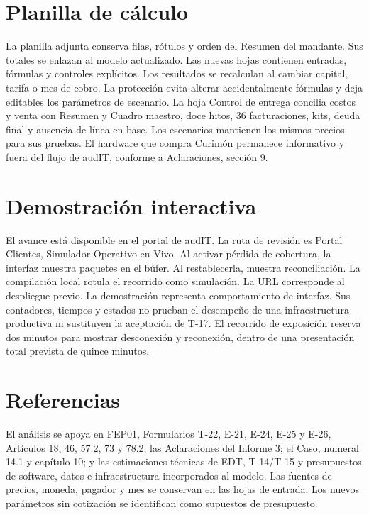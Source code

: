 \section{Planilla de cálculo}\label{sec:eco-planilla}
La planilla adjunta conserva filas, rótulos y orden del Resumen del mandante. Sus totales se enlazan al modelo actualizado. Las nuevas hojas contienen entradas, fórmulas y controles explícitos. Los resultados se recalculan al cambiar capital, tarifa o mes de cobro. La protección evita alterar accidentalmente fórmulas y deja editables los parámetros de escenario.
La hoja Control de entrega concilia costos y venta con Resumen y Cuadro maestro, doce hitos, 36 facturaciones, kits, deuda final y ausencia de línea en base. Los escenarios mantienen los mismos precios para sus pruebas. El hardware que compra Curimón permanece informativo y fuera del flujo de audIT, conforme a Aclaraciones, sección 9.

\section{Demostración interactiva}\label{sec:eco-demo}
El avance está disponible en \href{https://carlosabarza.github.io/PaginaAudIT/}{el portal de audIT}. La ruta de revisión es Portal Clientes, Simulador Operativo en Vivo. Al activar pérdida de cobertura, la interfaz muestra paquetes en el búfer. Al restablecerla, muestra reconciliación. La compilación local rotula el recorrido como simulación. La URL corresponde al despliegue previo.
La demostración representa comportamiento de interfaz. Sus contadores, tiempos y estados no prueban el desempeño de una infraestructura productiva ni sustituyen la aceptación de T-17. El recorrido de exposición reserva dos minutos para mostrar desconexión y reconexión, dentro de una presentación total prevista de quince minutos.

\section*{Referencias}
El análisis se apoya en FEP01, Formularios T-22, E-21, E-24, E-25 y E-26, Artículos 18, 46, 57.2, 73 y 78.2; las Aclaraciones del Informe 3; el Caso, numeral 14.1 y capítulo 10; y las estimaciones técnicas de EDT, T-14/T-15 y presupuestos de software, datos e infraestructura incorporados al modelo. Las fuentes de precios, moneda, pagador y mes se conservan en las hojas de entrada. Los nuevos parámetros sin cotización se identifican como supuestos de presupuesto.

